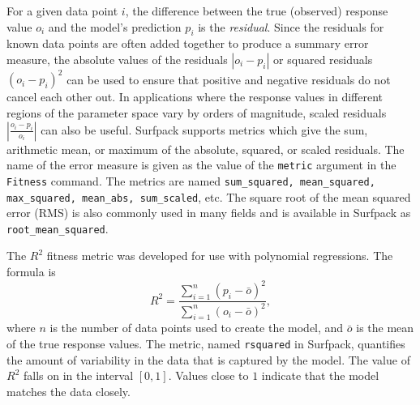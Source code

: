 \documentclass{article}
\begin{document}
For a given data point $i$, the difference between the true (observed)
response value $o_i$ and the model's prediction $p_i$ is the {\em
  residual}.  Since the residuals for known data points are often
added together to produce a summary error measure, the absolute values
of the residuals $|o_i - p_i|$ or squared residuals $(o_i - p_i)^2$
can be used to ensure that positive and negative residuals do not
cancel each other out.  In applications where the response values in
different regions of the parameter space vary by orders of magnitude,
scaled residuals $|\frac{o_i - p_i}{o_i}|$ can also be useful.
Surfpack supports metrics which give the sum, arithmetic mean, or
maximum of the absolute, squared, or scaled residuals.  The name of
the error measure is given as the value of the \texttt{metric}
argument in the \texttt{Fitness} command.  The metrics are named
\texttt{sum\_squared, mean\_squared, max\_squared, mean\_abs,
  sum\_scaled}, etc.  The square root of the mean squared error (RMS)
is also commonly used in many fields and is available in Surfpack as
\texttt{root\_mean\_squared}.


The $R^2$ fitness metric was developed for use with polynomial regressions.  The formula is
\begin{equation}
  R^2 = \frac{\sum_{i=1}^{n}{\left(p_i - \bar{o}\right)^2}}{ \sum_{i=1}^{n}{\left(o_i - \bar{o}\right)^2}},
\end{equation}
where $n$ is the number of data points used to create the model, and $\bar{o}$ is the mean of the true response values.  The metric, named \texttt{rsquared} in Surfpack, quantifies the amount of variability in the data that is captured by the model.  The value of $R^2$ falls on in the interval $[0,1]$.  Values close to $1$ indicate that the model matches the data closely.
\end{document}
